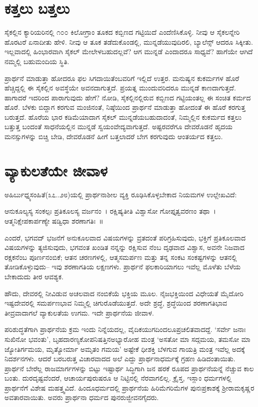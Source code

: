 \section*{ಕತ್ತಲು ಬತ್ತಲು}


ಸೈಕಲ್ಲಿನ ಕ್ಯಾರಿಯರಿನಲ್ಲಿ ೧೦೦ ಕಿಲೋಗ್ರಾಂ ತೂಕದ ಕಬ್ಬಿಣದ ಗಟ್ಟಿಯಿದೆ ಎಂದೆಣಿಸಿಕೊಳ್ಳಿ. ನೀವು ಆ ಸೈಕಲನ್ನೇರಿ ಹೊರಟರೆ ಏನಾದೀತು ಹೇಳಿ. ನೀವು ಆ ತೂಕ ತಡೆದುಕೊಂಡಲ್ಲಿ, ಮುನ್ನಡೆಯುವುದಿರಲಿ, ಬ್ಯಾಲೆನ್ಸ್ ಆದರೂ ಸಿಕ್ಕೀತು. ಇಲ್ಲವಾದಲ್ಲಿ ಹಿಂಭಾರವಾಗಿ ಸೈಕಲ್ ಮೇಲೇಳಬಹುದಲ್ಲವೆ? ಆಗ ಮುನ್ನಡೆ ಎಂದಾದರೂ ಸಾಧ್ಯವೆ? ಹಾಗೆಯೇ ಆಗಿದೆ ನಮ್ಮಲ್ಲಿ ಬಹುಮಂದಿಯ ಸ್ಥಿತಿ.

ಪ್ರಾರ್ಥನೆ ಮಾಡುತ್ತಾ ಹೋದರೂ ಫಲ ಸಿಗದಾಯಿತೆಂಬವರಿಗೆ ಇಲ್ಲಿದೆ ಉತ್ತರ. ಮನುಷ್ಯನ ಕುಕರ್ಮಗಳ ಹೊರೆ ಹೆಚ್ಚಿದ್ದಲ್ಲಿ ಈ ಸೈಕಲ್ಲಿನ ಅವಸ್ಥೆಯೇ ಅವನದಾಗುತ್ತದೆ. ಪ್ರಯತ್ನ ಮುಂದು\-ವರಿದರೂ ಮುನ್ನಡೆ ಕಾಣದಾಗುತ್ತದೆ. ಹಾಗಾದರೆ ಇದರಿಂದ ಪಾರಾಗುವುದು ಹೇಗೆ? ನೋಡಿ, ಸೈಕಲ್ಲಿನಲ್ಲಿರುವ ಕಬ್ಬಿಣದ ಗಟ್ಟಿಯಂತಲ್ಲ ಈ ಸಂಚಿತ ಕರ್ಮದ ಹೊರೆ. ಬೆಳಕು ಬಿದ್ದಾಗ ಕರಗುವ ಮಂಜಿನಂತೆ, ನಿಷ್ಠೆಯಿಂದ ಪ್ರಾರ್ಥನೆ ಮಾಡುತ್ತಾ ಹೋದಂತೆ ಈ ಹೊರೆ ಕರಗುತ್ತ ಬರುತ್ತದೆ. ಹೊರೆಯ ಭಾರ ಕಡಿಮೆಯಾದಾಗ ಸೈಕಲ್ ಮುನ್ನಡೆಯಬಹುದಾದಂತೆ, ನಿಮ್ಮಲ್ಲಿನ ಕುಕರ್ಮದ ಕತ್ತಲು ಬತ್ತುತ್ತ ಬಂದಂತೆ ಸಾಧನೆಯಲ್ಲಿನ ಮುನ್ನಡೆ ಸ್ವಯಂವೇದ್ಯವಾಗುತ್ತದೆ. ಅಷ್ಟರವರೆಗೂ ದೇವರೊಡನೆ ಹೃದಯ ಮನಸ್ಸುಗಳನ್ನು ಬಿಚ್ಚಿ ಬೇಡಿ, ದೇವರೊಡನೆ ಹೀಗೆ ಬತ್ತಲಾದರೆ ಬೇಗ ಕರಗುವುದು ಆಂತರ್ಯದ ಕತ್ತಲು.


\section*{ವ್ಯಾಕುಲತೆಯೇ ಜೀವಾಳ}


ಅಹಿರ್ಬುಧ್ನ್ಯಸಂಹಿತೆ(೩೭..೨೮)ಯಲ್ಲಿ ಪ್ರಾರ್ಥನಾಶೀಲ ವ್ಯಕ್ತಿ ರೂಢಿಸಿಕೊಳ್ಳಬೇಕಾದ ನಿಯಮಗಳ ಉಲ್ಲೇಖವಿದೆ:

ಆನುಕೂಲ್ಯಸ್ಯ ಸಂಕಲ್ಪಃ ಪ್ರತಿಕೂಲಸ್ಯ ವರ್ಜನಂ~। ರಕ್ಷಿಷ್ಯತೀತಿ ವಿಶ್ವಾಸೋ ಗೋಪ್ತೃತ್ವವರಣಂ ತಥಾ~। ಆತ್ಮನಿಕ್ಷೇಪಕಾರ್ಪಣ್ಯೇ ಷಡ್ವಿಧಾ ಶರಣಾಗತಿಃ~॥

ಎಂದರೆ, ಭಗವದ್ ಭಜನೆಗೆ ಅನುಕೂಲವಾದ ವಿಷಯಗಳನ್ನು ವ್ರತದಂತೆ ಪರಿಗ್ರಹಿಸುವುದು, ಭಕ್ತಿಗೆ ಪ್ರತಿಕೂಲವಾದ ವಿಷಯಗಳನ್ನು ತ್ಯಜಿಸುವುದು, ಭಗವಂತ ಖಂಡಿತ ನನ್ನನ್ನು ರಕ್ಷಿಸುವ ನೆಂಬ ದೃಢವಾದ ವಿಶ್ವಾಸ, ಅವನೇ ನಿಜವಾದ ರಕ್ಷಕನೆಂಬ ಪೂರ್ಣನಂಬಿಕೆ; ಆತನ ಚರಣಗಳಲ್ಲಿ, ಆತ್ಮಸಮರ್ಪಣ ಮತ್ತು ತನ್ನ ಸಂಕಟ ಸಂಕಷ್ಟಗಳನ್ನು ಆತನಲ್ಲಿ ತೋಡಿಕೊಳ್ಳುವುದು– ಇವು ಶರಣಾಗತಿಯ ಲಕ್ಷಣಗಳು. ಪ್ರಾರ್ಥನೆ ಫಲಕಾರಿಯಾಗಲು ಇವೆಲ್ಲ ಮೊಳೆತು ಬೆಳೆಯ ಬೇಕಾದುದು ತೀರ ಆವಶ್ಯಕ.

ಹೌದು, ದೇವರಲ್ಲಿ ನೀವಿಡುವ ಅಚಲವಾದ ನಂಬಿಕೆಯೆ ಭಕ್ತಿಯ ಮೂಲ. ನೈಜಭಕ್ತಿಯಿಂದ ವಿಧೇಯತೆ ಮೈದೋರಿ ಇಷ್ಟದೇವರಲ್ಲಿ ಸಮರ್ಪಣಭಾವ ನಿಮ್ಮಲ್ಲಿ ಚಿಗುರೊಡೆ\-\break ಯುತ್ತದೆ. ಅದೇ ಶ್ರದ್ಧೆ, ಶ್ರದ್ಧೆಯಿಂದ ಶರಣಾಗತಿಭಾವ ತೀವ್ರವಾದಾಗಲೆ ವ್ಯಾಕುಲತೆಯ ಉಗಮ. ಇದೇ ಪ್ರಾರ್ಥನೆಯ ಜೀವಾಳ.

ಪರಿಶುದ್ಧತೆಗಾಗಿ ಪ್ರಾರ್ಥನೆಯ ಕ್ರಮ ಇಂದು ನಿನ್ನೆಯದಲ್ಲ, ವೈದಿಕಯುಗದಿಂದಲೂ\break ಪ್ರಚಲಿತವಾದದ್ದೆ. ‘ಸರ್ವೇ ಜನಾಃ ಸುಖಿನೋ ಭವಂತು’, ಬೃಹದಾರಣ್ಯಕೋಪನಿಷತ್ತಿನ\break ಅಭ್ಯಾರೋಹ ಮಂತ್ರ ‘ಅಸತೋ ಮಾ ಸದ್ಗಮಯ, ತಮಸೋ ಮಾ ಜ್ಯೋತಿರ್ಗಮಯ, ಮೃತ್ಯೋರ್ಮಾ ಅಮೃತಂ ಗಮಯ’ ಅಷ್ಟೇಕೆ ಧೀಶಕ್ತಿ ಬೆಳಗುವ ಗಾಯತ್ರಿ ಮಂತ್ರ ಇವೆಲ್ಲ ಅದಕ್ಕೆ ನಿದರ್ಶನಗಳು. ಆದರೆ ಬರಬರುತ್ತ ವಿಚಾರವಾದದ ಅಲೆ ಎದ್ದು ಪ್ರಾರ್ಥನಾಧರ್ಮಕ್ಕೆ ಗ್ರಹಣ ಹಿಡಿದಂತಾಯಿತು. ಪ್ರಾರ್ಥನೆ ಬೇರೆಲ್ಲ ರಾಜಮಾರ್ಗಗಳನ್ನು ಬಿಟ್ಟು ಇಷ್ಟಾರ್ಥ ಸಿದ್ಧಿಗಾಗಿ ಜನ ಹರಕೆ ರೂಪದ ಪ್ರಾರ್ಥನೆಯನ್ನೆ ನೆಚ್ಚುವ ಕಾಲ ಬಂತು. ದುರದೃಷ್ಟವೆಂದರೆ, ಆಚಾರ್ಯಪುರುಷರೂ ಆ ನಿಟ್ಟಿನಲ್ಲಿ ನೆರವಾಗಲಿಲ್ಲ. ಕ್ರೈಸ್ತ, ಇಸ್ಲಾಂ ಧರ್ಮಗಳಲ್ಲಿ ಪ್ರಾರ್ಥನೆಗೆ ವಿಶೇಷ ಮಹತ್ತ್ವವಿದೆ. ಹಿಂದೂಧರ್ಮದಲ್ಲಿ ಪ್ರಾರ್ಥನೆಯ ಹಿರಿಮೆಗರಿಮೆಗಳ ಪುನಃಪ್ರಕಾಶಕ್ಕೆ ಶ‍್ರೀರಾಮಕೃಷ್ಣರ ಅವತಾರವಾಯಿತು. ಅವರು ಪ್ರಾರ್ಥನಾ ಧರ್ಮದ ಪುನರುಜ್ಜೀವನ\-ಗೈದರು.

